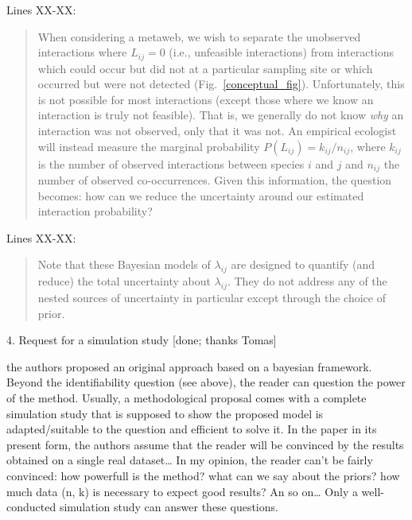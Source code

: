 \documentclass[12pt]{letter}
\newenvironment{refquote}{\bigskip \begin{it}}{\end{it}\smallskip}
\begin{document}
		Lines XX-XX:


		\begin{quotation}
			When considering a metaweb, we wish to separate the unobserved interactions where $L_{ij} = 0$ (i.e., unfeasible interactions) from interactions which could occur but did not at a particular sampling site or which occurred but were not detected (Fig.~\ref{conceptual_fig}). Unfortunately, this is not possible for most interactions (except those where we know an interaction is truly not feasible). That is, we generally do not know \emph{why} an interaction was not observed, only that it was not. An empirical ecologist will instead measure the marginal probability $P(L_{ij}) = k_{ij}/n_{ij}$, where $k_{ij}$ is the number of observed interactions between species $i$ and $j$ and $n_{ij}$ the number of observed co-occurrences. Given this information, the question becomes: how can we reduce the uncertainty around our estimated interaction probability?
		\end{quotation}


		Lines XX-XX:


		\begin{quotation}
			Note that these Bayesian models of $\lambda_{ij}$ are designed to quantify (and reduce) the total uncertainty about $\lambda_{ij}$. They do not address any of the nested sources of uncertainty in particular except through the choice of prior.
		\end{quotation}


	4. Request for a simulation study [done; thanks Tomas]


		\begin{refquote}
			the authors proposed an original approach based on a bayesian framework. Beyond the identifiability question (see above), the reader can question the power of the method. Usually, a methodological proposal comes with a complete simulation study that is supposed to show  the proposed model is adapted/suitable to the question and efficient to solve it. In the paper in its present form, the authors assume that the reader will be convinced by the results obtained on a single real dataset… In my opinion, the reader can’t be fairly convinced: how powerfull is the method? what can we say about the priors? how much data (n, k) is necessary to expect good results? An so on… Only a well-conducted simulation study can answer these questions.
		\end{refquote}
\end{document}
